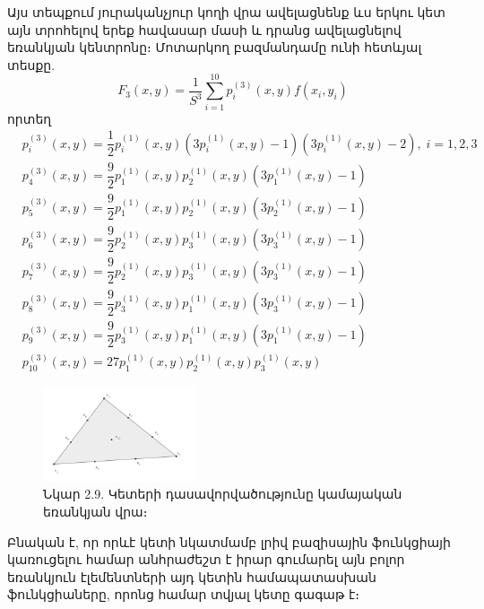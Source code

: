 \documentclass[fleqn, bachelor,subf,12pt,notitlepage]{article}
\begin{document}
\begin{enumerate}[leftmargin=0.0cm]
Այս տեպքում յուրականչյուր կողի վրա ավելացնենք ևս երկու կետ այն տրոհելով երեք հավասար մասի  և դրանց ավելացնելով եռանկյան կենտրոնը։ Մոտարկող բազմանդամը ունի հետևյալ տեսքը.
\begin{equation}
F_{3}(x, y) = \dfrac{1}{S^{3}}\sum_{i=1}^{10} p^{(3)}_{i}(x,y)f(x_{i}, y_{i})
\end{equation}
որտեղ 
\begin{equation}
\begin{aligned}
&p^{(3)}_{i}(x,y) =  \dfrac{1}{2}p^{(1)}_{i}(x,y)\left(3 p^{(1)}_{i}(x,y)-1\right)\left(3 p^{(1)}_{i}(x,y)-2\right), \; i = 1, 2, 3 \\
&p^{(3)}_{4}(x,y) =  \dfrac{9}{2}p^{(1)}_{1}(x,y) p^{(1)}_{2}(x,y)\left(3 p^{(1)}_{1}(x,y)-1\right)\\
&p^{(3)}_{5}(x,y) =  \dfrac{9}{2}p^{(1)}_{1}(x,y) p^{(1)}_{2}(x,y)\left(3 p^{(1)}_{2}(x,y)-1\right)\\
&p^{(3)}_{6}(x,y) =  \dfrac{9}{2}p^{(1)}_{2}(x,y) p^{(1)}_{3}(x,y)\left(3 p^{(1)}_{3}(x,y)-1\right)\\
&p^{(3)}_{7}(x,y) =  \dfrac{9}{2}p^{(1)}_{2}(x,y) p^{(1)}_{3}(x,y)\left(3 p^{(1)}_{3}(x,y)-1\right) \\
&p^{(3)}_{8}(x,y) =  \dfrac{9}{2}p^{(1)}_{3}(x,y) p^{(1)}_{1}(x,y)\left(3 p^{(1)}_{3}(x,y)-1\right)\\
&p^{(3)}_{9}(x,y) =  \dfrac{9}{2}p^{(1)}_{3}(x,y) p^{(1)}_{1}(x,y)\left(3 p^{(1)}_{1}(x,y)-1\right) \\
&p^{(3)}_{10}(x,y) = 27p^{(1)}_{1}(x,y)p^{(1)}_{2}(x,y)p^{(1)}_{3}(x,y)
\end{aligned}
\end{equation}

\begin{figure}[H]
\centering
\includegraphics[width=0.4\textwidth]{images/cubic_on_triangular}
\captionsetup{labelformat=empty}
\caption{Նկար 2.9. Կետերի դասավորվածությունը կամայական եռանկյան վրա։}
\end{figure}

\end{enumerate}
Բնական է, որ որևէ կետի նկատմամբ լրիվ բազիսային ֆունկցիայի կառուցելու համար անհրաժեշտ է իրար գումարել այն բոլոր եռանկյուն էլեմենտների այդ կետին համապատասխան ֆունկցիաները, որոնց համար տվյալ կետը գագաթ է։
\end{document}
